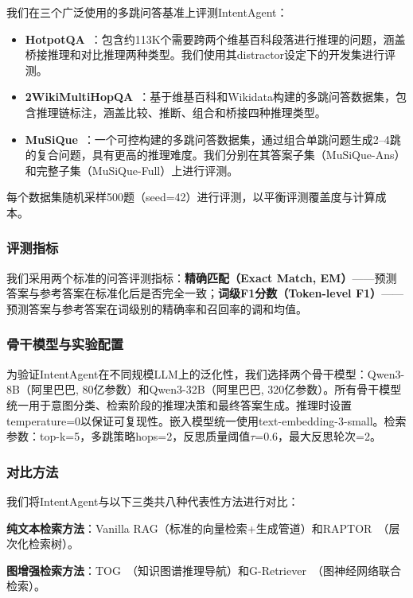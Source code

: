 \documentclass[runningheads]{llncs}
\begin{document}
我们在三个广泛使用的多跳问答基准上评测IntentAgent：

\begin{itemize}[leftmargin=*]
    \item \textbf{HotpotQA}~\cite{ref20}：包含约113K个需要跨两个维基百科段落进行推理的问题，涵盖桥接推理和对比推理两种类型。我们使用其distractor设定下的开发集进行评测。
    \item \textbf{2WikiMultiHopQA}~\cite{ref21}：基于维基百科和Wikidata构建的多跳问答数据集，包含推理链标注，涵盖比较、推断、组合和桥接四种推理类型。
    \item \textbf{MuSiQue}~\cite{ref22}：一个可控构建的多跳问答数据集，通过组合单跳问题生成2--4跳的复合问题，具有更高的推理难度。我们分别在其答案子集（MuSiQue-Ans）和完整子集（MuSiQue-Full）上进行评测。
\end{itemize}

每个数据集随机采样500题（seed=42）进行评测，以平衡评测覆盖度与计算成本。

\subsubsection{评测指标}

我们采用两个标准的问答评测指标：\textbf{精确匹配（Exact Match, EM）}——预测答案与参考答案在标准化后是否完全一致；\textbf{词级F1分数（Token-level F1）}——预测答案与参考答案在词级别的精确率和召回率的调和均值。

\subsubsection{骨干模型与实验配置}

为验证IntentAgent在不同规模LLM上的泛化性，我们选择两个骨干模型：Qwen3-8B（阿里巴巴, 80亿参数）和Qwen3-32B（阿里巴巴, 320亿参数）。所有骨干模型统一用于意图分类、检索阶段的推理决策和最终答案生成。推理时设置temperature=0以保证可复现性。嵌入模型统一使用text-embedding-3-small。检索参数：top-k=5，多跳策略hops=2，反思质量阈值$\tau$=0.6，最大反思轮次=2。

\subsubsection{对比方法}

我们将IntentAgent与以下三类共八种代表性方法进行对比：

\textbf{纯文本检索方法}：Vanilla RAG（标准的向量检索+生成管道）和RAPTOR~\cite{ref23}（层次化检索树）。

\textbf{图增强检索方法}：TOG~\cite{ref24}（知识图谱推理导航）和G-Retriever~\cite{ref25}（图神经网络联合检索）。
\end{document}
